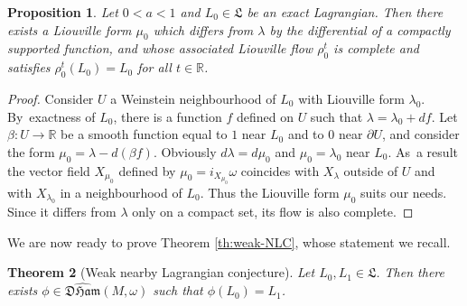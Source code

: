 \documentclass[JEP,XML,SOM,Unicode,NoFloatCountersInSection,published]{cedram}
\newtheorem{thm}{Theorem}[section]
\newtheorem{prop}[thm]{Proposition}
\theoremstyle{definition}
\newcommand{\R}{\mathbb{R}}
\newcommand{\DHam}{\mathfrak{DHam}}
\newcommand{\fL}{\mathfrak {L}}
\begin{document}
\begin{prop} \label{prop:exact-are-fixed-points}
Let $0<a<1$ and $L_{0} \in \fL$ be an exact Lagrangian. Then there exists a Liouville form $\mu_0$ which differs from $\lambda$ by the differential of a compactly supported function, and whose associated Liouville flow $\rho_0^t$ is complete and satisfies $\rho_0^t(L_{0})=L_{0}$ for all $t\in\R$.
\end{prop}

\begin{proof}
Consider $U$ a Weinstein neighbourhood of $L_0$ with Liouville form $\lambda_{0}$. By~exactness of $L_0$, there is a function $f$ defined on $U$ such that $\lambda=\lambda_{0}+ df$.
Let $\beta:U\to\R$ be a smooth function equal to $1$ near $L_{0}$ and to $0$ near $\partial U$, and consider the form $\mu_0 = \lambda - d(\beta f)$. Obviously $d\lambda=d\mu_0$ and $\mu_0 = \lambda_{0}$ near $L_{0}$. As~a result the vector field $X_{\mu_0}$ defined by $\mu_0=i_{X_{\mu_0}}\omega$ coincides with $X_{\lambda}$ outside of $U$ and with $X_{\lambda_{0}}$ in a neighbourhood of $L_0$. Thus the Liouville form $\mu_0$ suits our needs. Since it differs from $\lambda$ only on a compact set, its flow is also complete.
\end{proof}

We are now ready to prove Theorem \ref{th:weak-NLC}, whose statement we recall.
\setcounter{section}{1}
\setcounter{thm}{7}
\begin{thm}[Weak nearby Lagrangian conjecture]\label{Theorem-A4}
Let $L_{0}, L_{1} \in \fL$. Then there exists $\phi \in \widehat{\DHam}(M, \omega)$ such that $\phi(L_{0})=L_{1}$.
\end{thm}
\setcounter{section}{7}
\setcounter{thm}{3}
\end{document}
